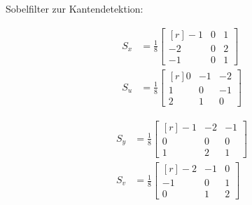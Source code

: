 Sobelfilter zur Kantendetektion:
\begin{multicols}{2}
\begin{align*}
 S_x &= \frac{1}{8} \begin{bmatrix}[r] -1&0&1 \\ -2&0&2 \\ -1&0&1 \end{bmatrix} \\
 S_u &= \frac{1}{8} \begin{bmatrix}[r] 0&-1&-2 \\ 1&0&-1 \\ 2&1&0 \end{bmatrix}
\end{align*}

\columnbreak

\begin{align*}
 S_y &= \frac{1}{8} \begin{bmatrix}[r] -1&-2&-1 \\ 0&0&0 \\ 1&2&1 \end{bmatrix} \\
 S_v &= \frac{1}{8} \begin{bmatrix}[r] -2&-1&0 \\ -1&0&1 \\ 0&1&2 \end{bmatrix}
\end{align*}

\end{multicols}
